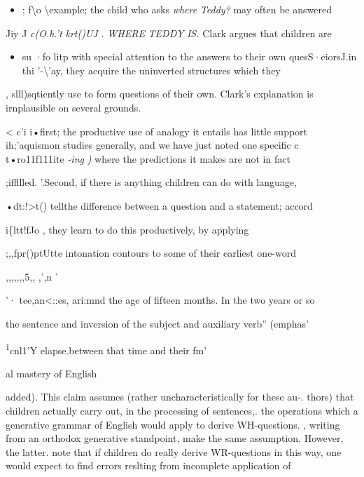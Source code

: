 \begin{itemize}
\item ; f{\textbackslash}o {\textbackslash}example; the child who asks \textit{where} \textit{Teddy?} may often be answered
\end{itemize}

Jiy J \textit{c(O.}\textit{h.'t} \textit{krt()UJ} \textit{.} \textit{WHERE} \textit{TEDDY} \textit{IS.} Clark argues that children are

\begin{itemize}
\item su ·fo litp with special attention to the answers to their own ques\-S·eiorsJ.in thi '-{\textbackslash}'ay, they acquire the uninverted structures which they
\end{itemize}

, slll)sqtiently use to form questions of their own. Clark's explanation is irnplausible on several grounds.

{\textless} c'i i•first; the productive use of analogy it entails has little support ih;'aquismon studies generally, and we have just noted one specific c t•ro11f111ite \textit{{}-i}\textit{n}\textit{g{\textquotedbl}} \textit{)} where the predictions it makes are not in fact

;iffllled. '.Second, if there is anything children can do with language,

•dt:!{\textgreater}t() tellthe difference between a question and a statement; accord\-

i\{ltt!fJo \citet{Halliday1975}, they learn to do this productively, by applying

;,,fpr()ptUtte intonation contours to some of their earliest one-word

,,,,,,,5,, ,',n '

'· tee,an{\textless}::es, ari:mnd the age of fifteen months. In the two years or so

the sentence and inversion of the subject and auxiliary verb'' (emphas'

\textsuperscript{1}cnl1'Y elapse.between that time and their fm'

al mastery of English

added). This claim assumes (rather uncharacteristically for these au-. thors) that children actually carry out, in the processing of sentences,. the operations which a generative grammar of English would apply to derive WH-questions. \citet{ErreichEtAl1980}, writing from an orthodox generative standpoint, make the same assumption. However, the latter. note that if children do really derive WR-questions in this way, one would expect to find errors reslting from incomplete application of

